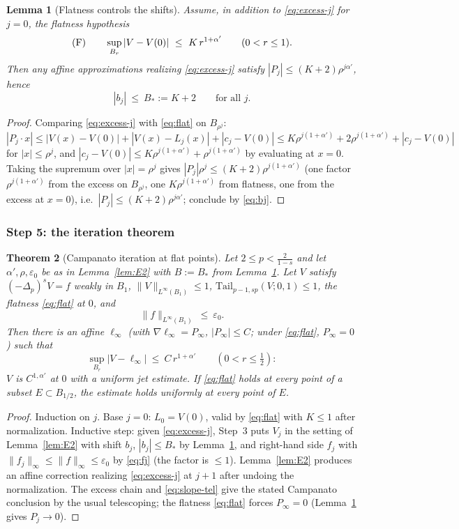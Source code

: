 \documentclass[11pt]{amsart}
\theoremstyle{plain}
\newtheorem{theorem}{Theorem}[section]
\newtheorem{lemma}[theorem]{Lemma}
\theoremstyle{definition}
\theoremstyle{remark}
\newcommand{\fpl}[1]{(-\Delta_p)^{s}#1}
\newcommand{\al}{\alpha}
\newcommand{\Tail}{\mathrm{Tail}_{p-1,sp}}
\begin{document}
\begin{lemma}[Flatness controls the shifts]\label{lem:E3}
Assume, in addition to \eqref{eq:excess-j} for $j=0$, the flatness
hypothesis
\begin{equation}\label{eq:flat}
  \textnormal{(F)}\qquad
  \sup_{B_r}|V-V(0)|\ \le\ K\,r^{1+\al'}\qquad(0<r\le1).
\end{equation}
Then any affine approximations realizing \eqref{eq:excess-j} satisfy
$|P_j|\le(K+2)\rho^{j\al'}$, hence
\[
  |b_j|\ \le\ B_*:=K+2\qquad\text{for all }j .
\]
\end{lemma}
\begin{proof}
Comparing \eqref{eq:excess-j} with \eqref{eq:flat} on $B_{\rho^j}$:
$|P_j\cdot x|\le|V(x)-V(0)|+|V(x)-L_j(x)|+|c_j-V(0)|
\le K\rho^{j(1+\al')}+2\rho^{j(1+\al')}+|c_j-V(0)|$ for $|x|\le\rho^j$, and
$|c_j-V(0)|\le K\rho^{j(1+\al')}+\rho^{j(1+\al')}$ by evaluating at $x=0$.
Taking the supremum over $|x|=\rho^j$ gives
$|P_j|\rho^j\le(K+2)\rho^{j(1+\al')}$ \textnormal{(}one factor
$\rho^{j(1+\al')}$ from the excess on $B_{\rho^j}$, one $K\rho^{j(1+\al')}$
from flatness, one from the excess at $x=0$\textnormal{)}, i.e.\
$|P_j|\le(K+2)\rho^{j\al'}$; conclude by \eqref{eq:bj}.
\end{proof}

\subsubsection*{Step 5: the iteration theorem}
\begin{theorem}[Campanato iteration at flat points]\label{thm:E4}
Let $2\le p<\frac2{1-s}$ and let $\al',\rho,\varepsilon_0$ be as in
Lemma~\ref{lem:E2} with $B:=B_*$ from Lemma~\ref{lem:E3}. Let $V$ satisfy
$\fpl{V}=f$ weakly in $B_1$, $\|V\|_{L^\infty(B_1)}\le1$,
$\Tail(V;0,1)\le1$, the flatness \eqref{eq:flat} at $0$, and
\[
  \|f\|_{L^\infty(B_1)}\ \le\ \varepsilon_0 .
\]
Then there is an affine $\ell_\infty$ \textnormal{(}with
$\nabla\ell_\infty=P_\infty$, $|P_\infty|\le C$; under \eqref{eq:flat},
$P_\infty=0$\textnormal{)} such that
\[
  \sup_{B_r}|V-\ell_\infty|\ \le\ C\,r^{1+\al'}\qquad(0<r\le\tfrac12) :
\]
$V$ is $C^{1,\al'}$ at $0$ with a uniform jet estimate. If \eqref{eq:flat}
holds at every point of a subset $E\subset B_{1/2}$, the estimate holds
uniformly at every point of $E$.
\end{theorem}
\begin{proof}
Induction on $j$. Base $j=0$: $L_0=V(0)$, valid by \eqref{eq:flat} with
$K\le1$ after normalization. Inductive step: given \eqref{eq:excess-j},
Step~3 puts $V_j$ in the setting of Lemma~\ref{lem:E2} with shift $b_j$,
$|b_j|\le B_*$ by Lemma~\ref{lem:E3}, and right-hand side $f_j$ with
$\|f_j\|_\infty\le\|f\|_\infty\le\varepsilon_0$ by \eqref{eq:fj}
\textnormal{(}the factor is $\le1$\textnormal{)}. Lemma~\ref{lem:E2}
produces an affine correction realizing \eqref{eq:excess-j} at $j+1$ after
undoing the normalization. The excess chain and \eqref{eq:slope-tel} give
the stated Campanato conclusion by the usual telescoping; the flatness
\eqref{eq:flat} forces $P_\infty=0$ \textnormal{(}Lemma~\ref{lem:E3} gives
$P_j\to0$\textnormal{)}.
\end{proof}
\end{document}
